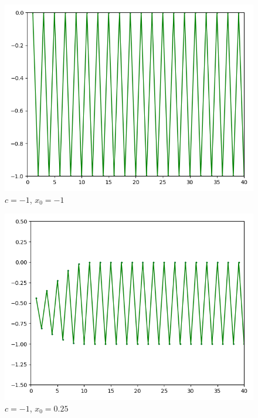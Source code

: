 \documentclass[]{article}
\begin{document}
\begin{figure}[!htbp]
	\includegraphics[scale=1]{task6-1-1}
	\centering
	\caption{$c = -1$, $x_0 = -1$}
\end{figure}
\begin{figure}[!htbp]
	\includegraphics[scale=1]{task6-10,25}
	\centering
	\caption{$c = -1$, $x_0 = 0.25$}
\end{figure}
\end{document}
